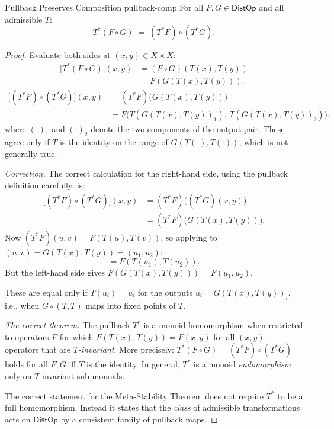 \documentclass[12pt,twoside,openright]{book}
\newcommand{\distPairs}{X\times X}
\newcommand{\distOp}{\mathsf{DistOp}}
\providecommand{\pullback}[2]{#1^{*}#2}
\begin{document}
\begin{theorem}{Pullback Preserves Composition}%
  {pullback-comp}
For all $F,G\in\distOp$ and all admissible $T$:
\[
  \pullback{T}{(F\circ G)}
  \;=\;
  (\pullback{T}{F})\circ(\pullback{T}{G}).
\]
\begin{proof}
Evaluate both sides at $(x,y)\in\distPairs$:
\begin{align*}
  \bigl[\pullback{T}{(F\circ G)}\bigr](x,y)
  &= (F\circ G)(T(x),T(y)) \\
  &= F(G(T(x),T(y))).
\end{align*}
\begin{align*}
  \bigl[(\pullback{T}{F})\circ(\pullback{T}{G})\bigr](x,y)
  &= (\pullback{T}{F})\bigl(G(T(x),T(y))\bigr) \\
  &= F\bigl(T(G(T(x),T(y))_1),\,T(G(T(x),T(y))_2)\bigr),
\end{align*}
where $(\cdot)_1$ and $(\cdot)_2$ denote the two components
of the output pair. These agree only if $T$ is the identity on
the range of $G(T(\cdot),T(\cdot))$, which is not generally
true.

\medskip
\noindent\textit{Correction.} The correct calculation for the
right-hand side, using the pullback definition carefully, is:
\begin{align*}
  \bigl[(\pullback{T}{F})\circ(\pullback{T}{G})\bigr](x,y)
  &= (\pullback{T}{F})\bigl((\pullback{T}{G})(x,y)\bigr) \\
  &= (\pullback{T}{F})\bigl(G(T(x),T(y))\bigr).
\end{align*}
Now $(\pullback{T}{F})(u,v)=F(T(u),T(v))$, so applying to
$(u,v)=G(T(x),T(y))=(u_1,u_2)$:
\[
  = F(T(u_1),T(u_2)).
\]
But the left-hand side gives $F(G(T(x),T(y)))=F(u_1,u_2)$.

These are equal only if $T(u_i)=u_i$ for the outputs
$u_i=G(T(x),T(y))_i$, i.e., when $G\circ(T,T)$ maps into
fixed points of $T$.

\medskip
\noindent\textit{The correct theorem.} The pullback $T^*$ is a
monoid homomorphism when restricted to operators $F$ for which
$F(T(x),T(y))=F(x,y)$ for all $(x,y)$ --- operators that are
\emph{$T$-invariant}. More precisely:
$T^*(F\circ G)=(T^*F)\circ(T^*G)$ holds for all $F,G$ iff
$T$ is the identity. In general, $T^*$ is a monoid
\emph{endomorphism} only on $T$-invariant sub-monoids.

The correct statement for the Meta-Stability Theorem does not
require $T^*$ to be a full homomorphism. Instead it states
that the \emph{class} of admissible transformations acts on
$\distOp$ by a consistent family of pullback maps.
\end{proof}
\end{theorem}
\end{document}
